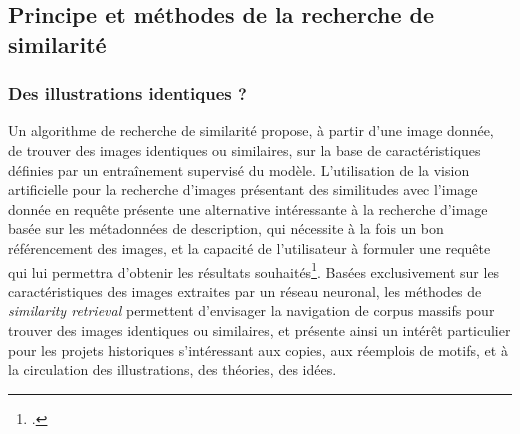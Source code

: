 
\subsection{Principe et méthodes de la recherche de similarité}
    \subsubsection{Des illustrations identiques ?}
    Un algorithme de recherche de similarité propose, à partir d'une image donnée, de trouver des images identiques ou similaires, sur la base de caractéristiques définies par un entraînement supervisé du modèle. L'utilisation de la vision artificielle pour la recherche d'images présentant des similitudes avec l'image donnée en requête présente une alternative intéressante à la recherche d'image basée sur les métadonnées de description, qui nécessite à la fois un bon référencement des images, et la capacité de l'utilisateur à formuler une requête qui lui permettra d'obtenir les résultats souhaités\footcite{farleyImageRetrievalConcepts2023}. Basées exclusivement sur les caractéristiques des images extraites par un réseau neuronal, les méthodes de \textit{similarity retrieval} permettent d'envisager la navigation de corpus massifs pour trouver des images identiques ou similaires, et présente ainsi un intérêt particulier pour les projets historiques s'intéressant aux copies, aux réemplois de motifs, et à la circulation des illustrations, des théories, des idées.
    
